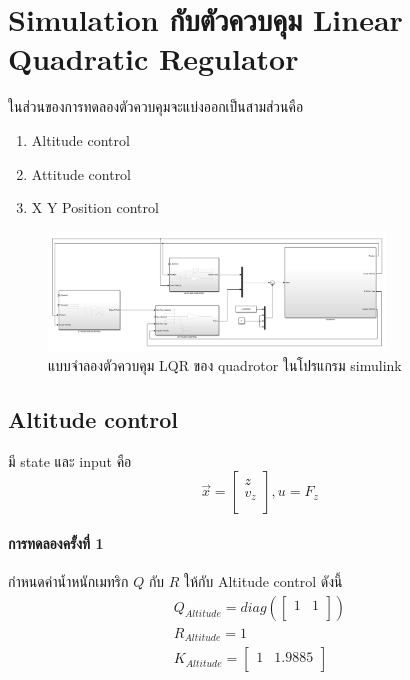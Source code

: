 \clearpage
\section{Simulation กับตัวควบคุม Linear Quadratic Regulator}
ในส่วนของการทดลองตัวควบคุมจะแบ่งออกเป็นสามส่วนคือ
\vspace{-10pt}
\begin{enumerate}[label=\arabic*), leftmargin=1.5cm]
	\setlength\itemsep{-0.25em}
    \item Altitude control
    \item Attitude control
    \item X Y Position control
\end{enumerate}
\vspace{-15pt}
\begin{figure}[!ht]
	\centering
	\includegraphics[width=0.8\textwidth]{images/simulink/lqr_all.png}
	\caption{แบบจำลองตัวควบคุม LQR ของ quadrotor ในโปรแกรม simulink}
\end{figure}

\subsection{Altitude control}
มี state และ input คือ
\begin{equation}
    {\vec{x}=\begin{bmatrix}
        z \\ v_z \\
    \end{bmatrix}, u = F_z}
\end{equation}

\paragraph*{การทดลองครั้งที่ 1}
กำหนดค่าน้ำหนักเมทริก $Q$ กับ $R$ ให้กับ Altitude control ดังนี้
\begin{equation}
    \begin{array}{c}
    {Q_{Altitude}=diag(\begin{bmatrix}
        1 & 1 \\
    \end{bmatrix})}\\[10pt]
    {R_{Altitude} = 1}\\[10pt]
    {K_{Altitude} = \begin{bmatrix}
        1 & 1.9885 \\
    \end{bmatrix}} \\
    \end{array}
\end{equation}

